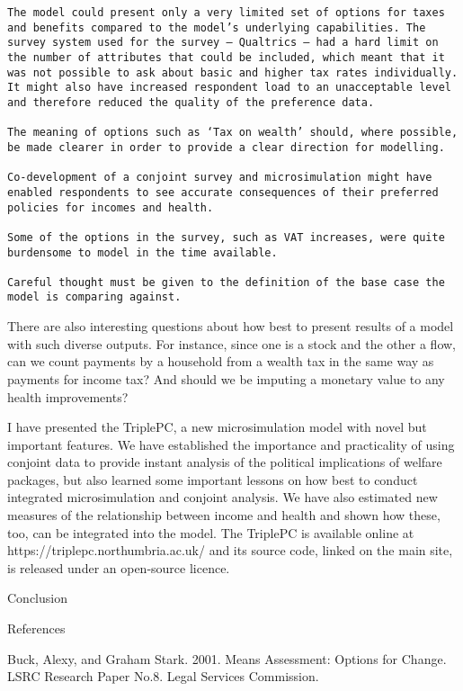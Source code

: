 \documentclass[
  letterpaper,
  DIV=11,
  numbers=noendperiod]{scrartcl}
\begin{document}
\begin{verbatim}
The model could present only a very limited set of options for taxes and benefits compared to the model’s underlying capabilities. The survey system used for the survey – Qualtrics – had a hard limit on the number of attributes that could be included, which meant that it was not possible to ask about basic and higher tax rates individually. It might also have increased respondent load to an unacceptable level and therefore reduced the quality of the preference data. 

The meaning of options such as ‘Tax on wealth’ should, where possible, be made clearer in order to provide a clear direction for modelling. 

Co-development of a conjoint survey and microsimulation might have enabled respondents to see accurate consequences of their preferred policies for incomes and health.  

Some of the options in the survey, such as VAT increases, were quite burdensome to model in the time available.  

Careful thought must be given to the definition of the base case the model is comparing against. 
\end{verbatim}

There are also interesting questions about how best to present results
of a model with such diverse outputs. For instance, since one is a stock
and the other a flow, can we count payments by a household from a wealth
tax in the same way as payments for income tax? And should we be
imputing a monetary value to any health improvements?

I have presented the TriplePC, a new microsimulation model with novel
but important features. We have established the importance and
practicality of using conjoint data to provide instant analysis of the
political implications of welfare packages, but also learned some
important lessons on how best to conduct integrated microsimulation and
conjoint analysis. We have also estimated new measures of the
relationship between income and health and shown how these, too, can be
integrated into the model. The TriplePC is available online at
https://triplepc.northumbria.ac.uk/ and its source code, linked on the
main site, is released under an open-source licence.

Conclusion

References

Buck, Alexy, and Graham Stark. 2001. Means Assessment: Options for
Change. LSRC Research Paper No.8. Legal Services Commission.
\end{document}
